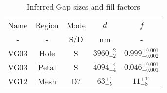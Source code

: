 \begin{table}[h!]
\caption{Inferred Gap sizes and fill factors \label{tbl_DerivedGapSizes}}
\begin{center}
    \begin{tabular}{ c c c c c }
    \hline
    Name & Region & Mode & $d$  &  $f$ \\ 
    -  & - & S/D & nm & - \\
    \hline

    VG03 & Hole    &   S  & $3960^{+2}_{-2}$ &  $0.999^{+0.001}_{-0.002}$\\
    VG03 & Petal   &   S  & $4094^{+4}_{-4}$ &  $0.046^{+0.001}_{-0.001}$\\
    VG12 & Mesh    &   D? & $63^{+1}_{-5}  $ &  $11^{+14}_{-8}$\\
    \hline
    \end{tabular}
\end{center}
\end{table}